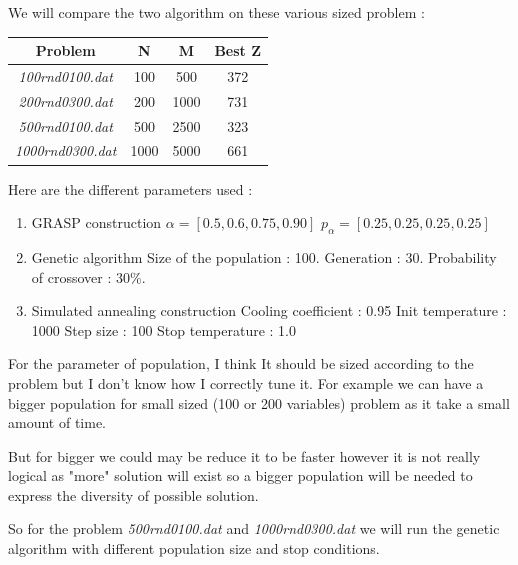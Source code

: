 \documentclass[12pt]{article}
\begin{document}
	We will compare the two algorithm on these various sized problem :
	\begin{center}
		\begin{tabular}{|c|c|c|c|}
			\hline
			Problem & N & M & Best Z \\
			\hline
			\textit{100rnd0100.dat} & 100 & 500 & 372 \\
			\hline
			\textit{200rnd0300.dat} & 200 & 1000 & 731 \\ 
			\hline
			\textit{500rnd0100.dat} & 500 & 2500 & 323  \\
			\hline
			\textit{1000rnd0300.dat} & 1000 & 5000 & 661 \\
			\hline
		\end{tabular}
	\end{center}
		
	Here are the different parameters used :
	\begin{enumerate}
		\item GRASP construction
		\subitem $ \alpha = [0.5,0.6,0.75,0.90]$
		\subitem $ p_{\alpha} = [0.25,0.25,0.25,0.25]$
		\item Genetic algorithm
		\subitem Size of the population : 100.
		\subitem Generation : 30.
		\subitem Probability of crossover : 30\%.
		\item Simulated annealing
		 construction
		\subitem Cooling coefficient : 0.95
		\subitem Init temperature : 1000
		\subitem Step size : 100
		\subitem Stop temperature : 1.0
	\end{enumerate}
	For the parameter of population, I think It should be sized according to the problem but I don't know how I correctly tune it. For example we can have a bigger population for small sized (100 or 200 variables) problem as it take a small amount of time. 
	
	But for bigger we could may be reduce it to be faster however it is not really logical as "more" solution will exist so a bigger population will be needed to express the diversity of possible solution.
	
	So for the problem \textit{500rnd0100.dat} and \textit{1000rnd0300.dat} we will run the genetic algorithm with different population size and stop conditions.
	
\end{document}
